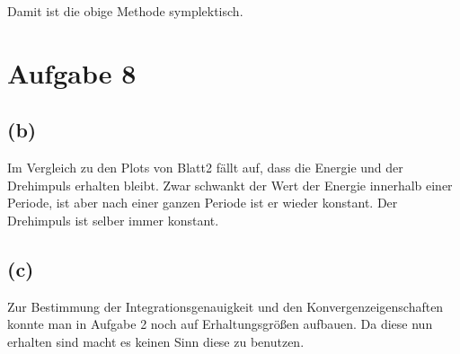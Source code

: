 \documentclass[a4paper,10pt]{article}
\begin{document}
Damit ist die obige Methode symplektisch.

\section{Aufgabe 8}

\subsection{(b)}
Im Vergleich zu den Plots von Blatt2 fällt auf, dass die Energie und der Drehimpuls erhalten bleibt.
Zwar schwankt der Wert der Energie innerhalb einer Periode, ist aber nach einer ganzen Periode ist er wieder konstant.
Der Drehimpuls ist selber immer konstant.

\subsection{(c)}
Zur Bestimmung der Integrationsgenauigkeit und den Konvergenzeigenschaften
konnte man in Aufgabe 2 noch auf Erhaltungsgrößen aufbauen. Da diese nun erhalten
sind macht es keinen Sinn diese zu benutzen.\\
% 
% 
\end{document}
